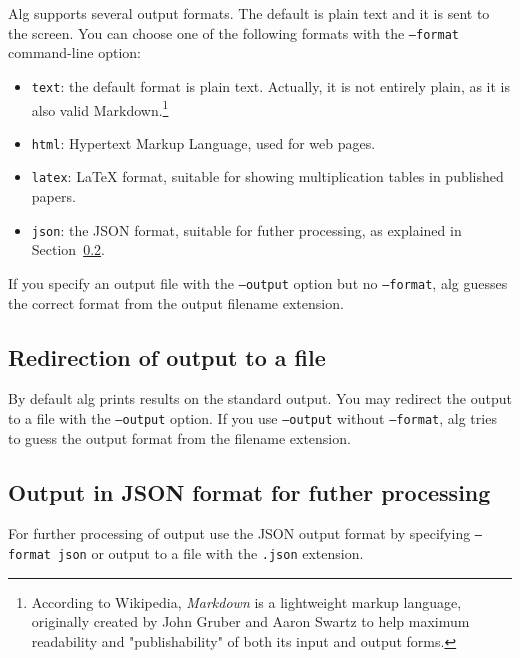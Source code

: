 \documentclass{article}
\begin{document}
Alg supports several output formats. The default is plain text and it
is sent to the screen. You can choose one of the following formats
with the \texttt{--format} command-line option:
%
\begin{itemize}
\item \texttt{text}: the default format is plain text. Actually, it is
  not entirely plain, as it is also valid Markdown.\footnote{According
    to Wikipedia, \emph{Markdown} is a lightweight markup language,
    originally created by John Gruber and Aaron Swartz to help maximum
    readability and "publishability" of both its input and output
    forms.}
\item \texttt{html}: Hypertext Markup Language, used for web pages.
\item \texttt{latex}: {\LaTeX} format, suitable for showing
  multiplication tables in published papers.
\item \texttt{json}: the JSON format, suitable for futher processing,
  as explained in Section~\ref{sec:json}.
\end{itemize}

If you specify an output file with the \texttt{--output} option but no
\texttt{--format}, alg guesses the correct format from the output
filename extension.

\subsection{Redirection of output to a file}

By default alg prints results on the standard output. You may redirect
the output to a file with the \texttt{--output} option. If you use
\texttt{--output} without \texttt{--format}, alg tries to guess the
output format from the filename extension.

\subsection{Output in JSON format for futher processing}
\label{sec:json}

For further processing of output use the JSON output format by
specifying \texttt{--format json} or output to a file with the
\texttt{.json} extension.
\end{document}
